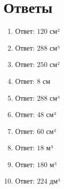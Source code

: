 \documentclass{umk-matematika}
\begin{document}
\section*{Ответы}

\begin{enumerate}
  \item Ответ: $120$ см²
  \item Ответ: $288$ см³
  \item Ответ: $250$ см²
  \item Ответ: $8$ см
  \item Ответ: $288$ см³
  \item Ответ: $48$ см³
  \item Ответ: $60$ см²
  \item Ответ: $18$ м³
  \item Ответ: $180$ м³
  \item Ответ: $224$ дм³
\end{enumerate}
\end{document}
